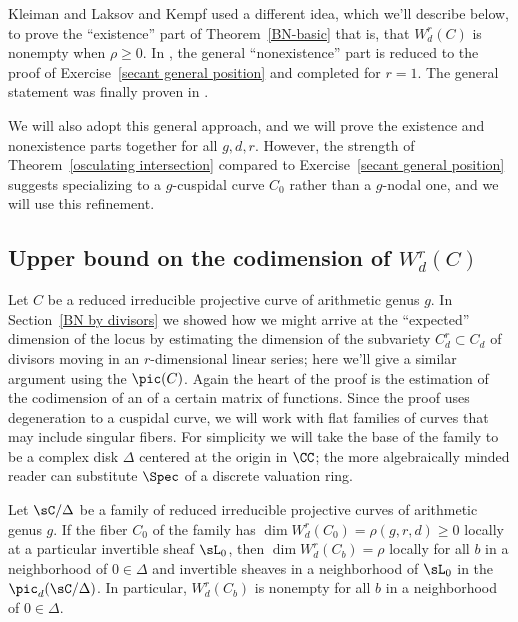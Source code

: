 Kleiman and Laksov \citeyear{MR323792,MR0357398} and 
Kempf \citeyear{Kempf} used a
%
%
%
different idea, which we'll describe
below, to prove the ``existence'' part of Theorem~\ref{BN-basic}
\emdash that is, that $W^{r}_{d}(C)$ is nonempty when $\rho\geq 0$.
In \cite{Kleiman-special}, the general ``nonexistence'' part is reduced
to the proof of Exercise~\ref{secant general position} and completed
for $r=1$. The general statement was finally proven in
\cite{Griffiths-Harris-BN}.

We will also adopt this general approach, and we will prove the existence
and nonexistence parts together
for all $g,d,r$. However, the strength of Theorem~\ref{osculating
intersection} compared to Exercise~\ref{secant general position} suggests
specializing to a $g$-cuspidal curve $C_0$ rather than a $g$-nodal one,
and we will use
this refinement.

\subsection*{Upper bound on the codimension of $W^r_d(C)$}

Let $C$ be a reduced irreducible projective curve of arithmetic genus
$g$.  In Section~\ref{BN by divisors} we showed how we might arrive
at the ``expected'' dimension of the locus 
%
by estimating the
dimension of the subvariety $C^r_d \subset C_d$ of divisors moving in
an $r$-dimensional linear series; here we'll give a similar argument
using the 
%
$\pic(C)$. Again the heart of the proof is the
estimation of the
codimension of an 
%
of a certain matrix of functions. Since
the proof uses degeneration
to a cuspidal curve, we will work with flat families of curves that may
include singular fibers. For simplicity
we will take the base of the family to be a complex disk $\Delta$
centered at the origin in $\CC$; the more algebraically minded reader
can substitute $\Spec$ of a 
discrete valuation ring.

\begin{theorem}\label{local existence}
Let $\sC/\Delta$ be a family of reduced irreducible projective curves
of arithmetic genus $g$. If
the fiber  $C_0$ of the family has $\dim W^r_d(C_0) = \rho(g,r,d) \geq 0$
locally at a particular invertible sheaf $\sL_{0}$,  then $\dim W^r_d(C_b)
= \rho$ locally for all $b$ in a neighborhood of $0 \in \Delta$ and
invertible sheaves in a neighborhood of $\sL_{0}$
in the 
%
$\pic_{d}(\sC/\Delta)$. In particular,
$W^r_d(C_b)$ is nonempty for all $b$ in a neighborhood of $0 \in \Delta$.
\unif
\end{theorem}


